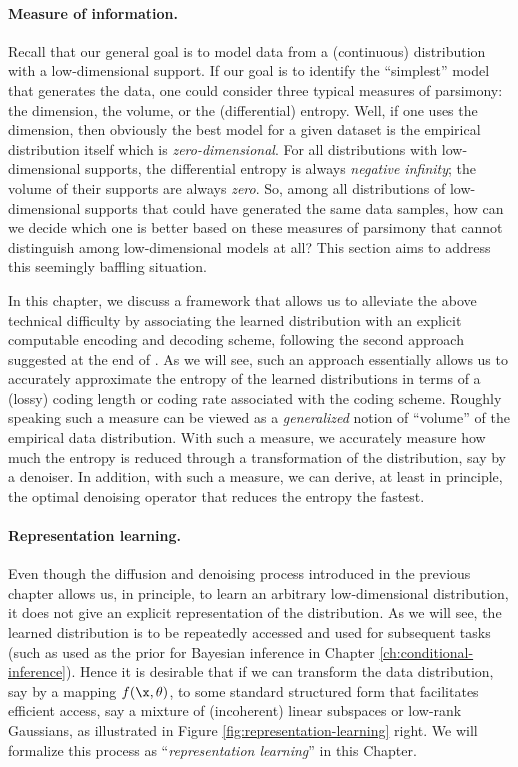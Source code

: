 \documentclass[../../book-main.tex]{subfiles}
\begin{document}
\paragraph{Measure of information.}
Recall that our general goal is to model data from a (continuous) distribution
with a low-dimensional support. If our goal is to identify the ``simplest''
model that generates the data, one could consider three typical measures of
parsimony: the dimension, the volume, or the (differential) entropy. Well, if
one uses the dimension, then obviously the best model for a given dataset is the
empirical distribution itself which is {\em zero-dimensional}. For all distributions with low-dimensional supports, the differential entropy is always {\em negative infinity}; the volume of their supports are always {\em zero}. So, among all distributions of low-dimensional supports that could have generated the same data samples, how can we decide which one is better based on these measures of parsimony that cannot distinguish among low-dimensional models at all? This section aims to address this seemingly baffling situation.

In this chapter, we discuss a framework that allows us to alleviate the above technical difficulty by associating the learned distribution with an explicit computable encoding and decoding scheme, following the second approach suggested at the end of . As we will see, such an approach essentially allows us to accurately approximate the entropy of the learned distributions in terms of a (lossy) coding length or coding rate associated with the coding scheme. Roughly speaking such a measure can be viewed as a {\em generalized} notion of ``volume'' of the empirical data distribution. With such a measure, we accurately measure how much the entropy is reduced through a transformation of the distribution, say by a denoiser. In addition, with such a measure, we can derive, at least in principle, the optimal denoising operator that reduces the entropy the fastest. 


\paragraph{Representation learning.}
Even though the diffusion and denoising process introduced in the previous chapter allows us, in principle, to learn an arbitrary low-dimensional distribution, it does not give an explicit representation of the distribution. As we will see, the learned distribution is to be repeatedly accessed and used for subsequent tasks (such as used as the prior for Bayesian inference in Chapter \ref{ch:conditional-inference}). Hence it is desirable that if we can transform the data distribution, say by a mapping $f(\x,\theta)$, to some standard structured form that facilitates efficient access, say a mixture of (incoherent) linear subspaces or low-rank Gaussians, as illustrated in Figure \ref{fig:representation-learning} right. We will formalize this process as ``{\em representation learning}'' in this Chapter.
\end{document}
